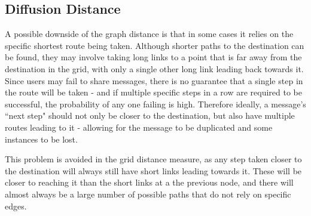 \documentclass[bsc,frontabs,twoside,singlespacing,parskip,deptreport]{infthesis}     %
\begin{document}
\subsection{Diffusion Distance} \label{subsec:diffusion_dist}

A possible downside of the graph distance is that in some cases it relies on the specific shortest route being taken. Although shorter paths to the destination can be found, they may involve taking long links to a point that is far away from the destination in the grid, with only a single other long link leading back towards it. Since users may fail to share messages, there is no guarantee that a single step in the route will be taken - and if multiple specific steps in a row are required to be successful, the probability of any one failing is high. Therefore ideally, a message's ``next step" should not only be closer to the destination, but also have multiple routes leading to it - allowing for the message to be duplicated and some instances to be lost.

This problem is avoided in the grid distance measure, as any step taken closer to the destination will always still have short links leading towards it. These will be closer to reaching it than the short links at a the previous node, and there will almost always be a large number of possible paths that do not rely on specific edges.
\end{document}
